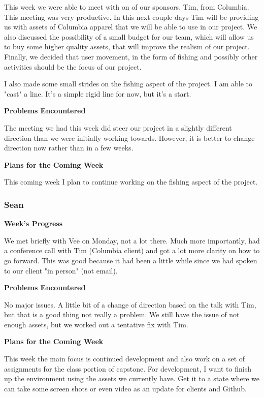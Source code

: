 \documentclass[10pt,journal,compsoc,onecolumn, draftclsnofoot]{IEEEtran}
\begin{document}
This week we were able to meet with on of our sponsors, Tim, from Columbia. This meeting was very productive. In this next couple days Tim will be providing us with assets of Columbia apparel that we will be able to use in our project. We also discussed the possibility of a small budget for our team, which will allow us to buy some higher quality assets, that will improve the realism of our project. Finally, we decided that user movement, in the form of fishing and possibly other activities should be the focus of our project.

I also made some small strides on the fishing aspect of the project. I am able to "cast" a line. It's a simple rigid line for now, but it's a start.

\noindent \textbf{Problems Encountered}

The meeting we had this week did steer our project in a slightly different direction than we were initially working towards. However, it is better to change direction now rather than in a few weeks.

\noindent \textbf{Plans for the Coming Week}

This coming week I plan to continue working on the fishing aspect of the project.

\subsubsection{Sean}
\noindent \textbf{Week's Progress}

We met briefly with Vee on Monday, not a lot there. Much more importantly, had a conference call with Tim (Columbia client) and got a lot more clarity on how to go forward. This was good because it had been a little while since we had spoken to our client "in person" (not email).

\noindent \textbf{Problems Encountered}

No major issues. A little bit of a change of direction based on the talk with Tim, but that is a good thing not really a problem. We still have the issue of not enough assets, but we worked out a tentative fix with Tim.

\noindent \textbf{Plans for the Coming Week}

This week the main focus is continued development and also work on a set of assignments for the class portion of capstone. For development, I want to finish up the environment using the assets we currently have.  Get it to a state where we can take some screen shots or even video as an update for clients and Github.
\end{document}
